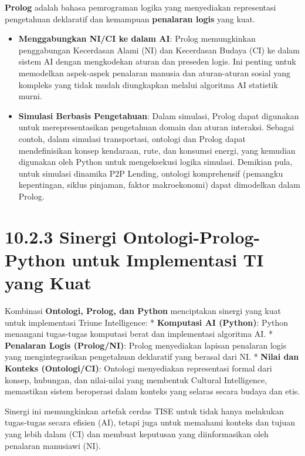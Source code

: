 \documentclass[
  letterpaper,
  DIV=11,
  numbers=noendperiod]{scrreprt}
\providecommand{\tightlist}{%
  \setlength{\itemsep}{0pt}\setlength{\parskip}{0pt}}
\begin{document}
\textbf{Prolog} adalah bahasa pemrograman logika yang menyediakan
representasi pengetahuan deklaratif dan kemampuan \textbf{penalaran
logis} yang kuat.

\begin{itemize}
\tightlist
\item
  \textbf{Menggabungkan NI/CI ke dalam AI}: Prolog memungkinkan
  penggabungan Kecerdasan Alami (NI) dan Kecerdasan Budaya (CI) ke dalam
  sistem AI dengan mengkodekan aturan dan preseden logis. Ini penting
  untuk memodelkan aspek-aspek penalaran manusia dan aturan-aturan
  sosial yang kompleks yang tidak mudah diungkapkan melalui algoritma AI
  statistik murni.
\item
  \textbf{Simulasi Berbasis Pengetahuan}: Dalam simulasi, Prolog dapat
  digunakan untuk merepresentasikan pengetahuan domain dan aturan
  interaksi. Sebagai contoh, dalam simulasi transportasi, ontologi dan
  Prolog dapat mendefinisikan konsep kendaraan, rute, dan konsumsi
  energi, yang kemudian digunakan oleh Python untuk mengeksekusi logika
  simulasi. Demikian pula, untuk simulasi dinamika P2P Lending, ontologi
  komprehensif (pemangku kepentingan, siklus pinjaman, faktor
  makroekonomi) dapat dimodelkan dalam Prolog.
\end{itemize}

\section{\texorpdfstring{\textbf{10.2.3 Sinergi Ontologi-Prolog-Python
untuk Implementasi TI yang
Kuat}}{10.2.3 Sinergi Ontologi-Prolog-Python untuk Implementasi TI yang Kuat}}\label{sinergi-ontologi-prolog-python-untuk-implementasi-ti-yang-kuat}

Kombinasi \textbf{Ontologi, Prolog, dan Python} menciptakan sinergi yang
kuat untuk implementasi Triune Intelligence: * \textbf{Komputasi AI
(Python)}: Python menangani tugas-tugas komputasi berat dan implementasi
algoritma AI. * \textbf{Penalaran Logis (Prolog/NI)}: Prolog menyediakan
lapisan penalaran logis yang mengintegrasikan pengetahuan deklaratif
yang berasal dari NI. * \textbf{Nilai dan Konteks (Ontologi/CI)}:
Ontologi menyediakan representasi formal dari konsep, hubungan, dan
nilai-nilai yang membentuk Cultural Intelligence, memastikan sistem
beroperasi dalam konteks yang selaras secara budaya dan etis.

Sinergi ini memungkinkan artefak cerdas TISE untuk tidak hanya melakukan
tugas-tugas secara efisien (AI), tetapi juga untuk memahami konteks dan
tujuan yang lebih dalam (CI) dan membuat keputusan yang diinformasikan
oleh penalaran manusiawi (NI).
\end{document}
